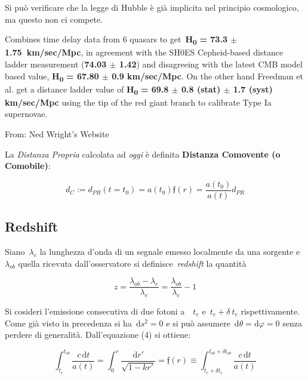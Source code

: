 Si può verificare che la legge di Hubble è già implicita nel principio
cosmologico, ma questo non ci compete.


\begin{definition}[Wong et al., 2019]
Combines time delay data from 6 quasars
to get~\textbf{H}\textsubscript{\textbf{0}} \textbf{= 73.3 $\pm$
1.75{~}km/sec/Mpc}, in agreement with the SH0ES Cepheid-based distance
ladder measurement (\textbf{74.03 $\pm$ 1.42}) and disagreeing with the
latest CMB model based value, \textbf{H}\textsubscript{\textbf{0}}
\textbf{= 67.80 $\pm$ 0.9 km/sec/Mpc}. On the other hand Freedman et al. get
a distance ladder value of \textbf{H}\textsubscript{\textbf{0}}
\textbf{= 69.8 $\pm$ 0.8 (stat) $\pm$ 1.7 (syst) km/sec/Mpc} using the tip of
the red giant branch to calibrate Type Ia supernovae.
\vspace*{0.5em}

From: Ned Wright's Website
\end{definition}

La \emph{Distanza Propria} calcolata ad \emph{oggi} è definita
\textbf{Distanza Comovente (o Comobile)}:

\begin{equation}
d_{C}:=d_{PR}(t=t_0)=a(t_0)\mathfrak{f}(r)=\frac{a(t_0)}{a(t)}d_{PR}
\end{equation}

\subsection{Redshift}

Siano~\(\lambda_e\) la lunghezza d'onda di un segnale emesso
localmente da una sorgente e~\(\lambda_{ob}\) quella ricevuta
dall'osservatore si definisce~\emph{redshift} la quantità

\begin{equation}
z=\frac{\lambda_{ob}-\lambda_e}{\lambda_e}=\frac{\lambda_{ob}}{\lambda_e}-1
\end{equation}

Si cosideri l'emissione consecutiva di due fotoni a~~\(t_e\)
e~\(t_e+\delta\ t_e\) rispettivamente. Come già visto in precedenza si
ha~\(\mathrm{d}s^2=0\) e si può assumere~\(\mathrm{d}\theta=\mathrm{d}\varphi=0\) senza perdere
di generalità. Dall'equazione (4) si ottiene:

\begin{equation}
\int_{t_{e}}^{t_{ob}}\frac{c\,\mathrm{d}t}{a(t)}=\int_{0}^{r}\frac{\mathrm{d}r'}{\sqrt{1-kr'}}=\mathfrak{f}(r)\equiv \int_{t_{e}+\delta t_e}^{t_{ob}+\delta t_{ob}}\frac{c\,\mathrm{d}t}{a(t)}
\end{equation}

